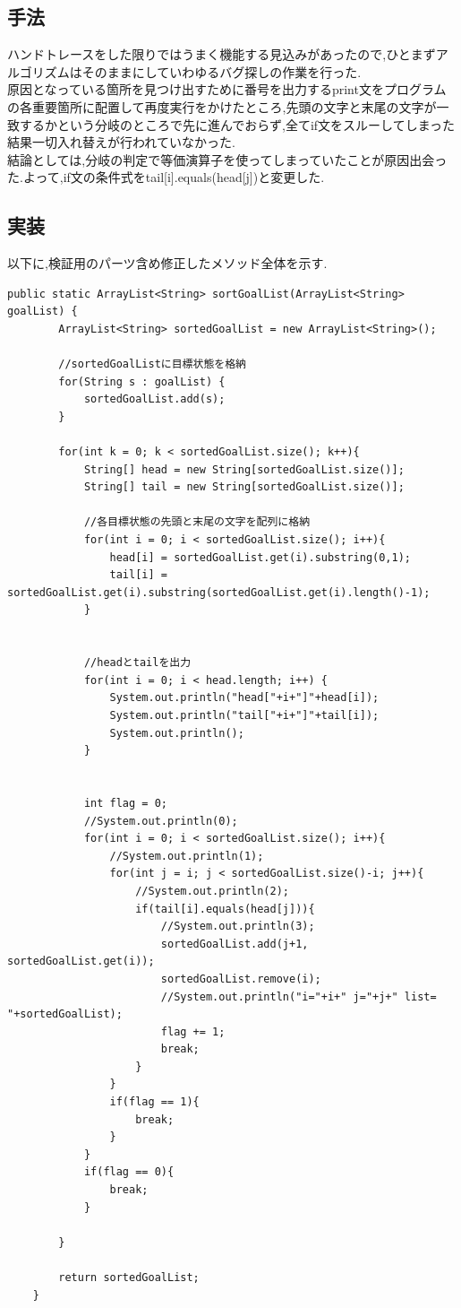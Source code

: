 \documentclass[12pt]{jarticle}
\begin{document}
\subsection{手法}
ハンドトレースをした限りではうまく機能する見込みがあったので,ひとまずアルゴリズムはそのままにしていわゆるバグ探しの作業を行った.\\
原因となっている箇所を見つけ出すために番号を出力するprint文をプログラムの各重要箇所に配置して再度実行をかけたところ,先頭の文字と末尾の文字が一致するかという分岐のところで先に進んでおらず,全てif文をスルーしてしまった結果一切入れ替えが行われていなかった.\\
結論としては,分岐の判定で等価演算子を使ってしまっていたことが原因出会った.よって,if文の条件式をtail[i].equals(head[j])と変更した.

\subsection{実装}
以下に,検証用のパーツ含め修正したメソッド全体を示す.\\

\begin{lstlisting}[caption=修正後プログラム, label=mid]
public static ArrayList<String> sortGoalList(ArrayList<String> goalList) {
		ArrayList<String> sortedGoalList = new ArrayList<String>();

		//sortedGoalListに目標状態を格納
		for(String s : goalList) {
			sortedGoalList.add(s);
		}

		for(int k = 0; k < sortedGoalList.size(); k++){
			String[] head = new String[sortedGoalList.size()];
			String[] tail = new String[sortedGoalList.size()];

			//各目標状態の先頭と末尾の文字を配列に格納
			for(int i = 0; i < sortedGoalList.size(); i++){
				head[i] = sortedGoalList.get(i).substring(0,1);
				tail[i] = sortedGoalList.get(i).substring(sortedGoalList.get(i).length()-1);
			}
			

			//headとtailを出力
			for(int i = 0; i < head.length; i++) {
				System.out.println("head["+i+"]"+head[i]);
				System.out.println("tail["+i+"]"+tail[i]);
				System.out.println();
			}


			int flag = 0;
			//System.out.println(0);
			for(int i = 0; i < sortedGoalList.size(); i++){
				//System.out.println(1);
				for(int j = i; j < sortedGoalList.size()-i; j++){
					//System.out.println(2);
					if(tail[i].equals(head[j])){
						//System.out.println(3);
						sortedGoalList.add(j+1, sortedGoalList.get(i));
						sortedGoalList.remove(i);
						//System.out.println("i="+i+" j="+j+" list= "+sortedGoalList);
						flag += 1;
						break;
					}
				}
				if(flag == 1){
					break;
				}			
			}
			if(flag == 0){
				break;
			}

		}

		return sortedGoalList;
	}
\end{lstlisting}
\end{document}

